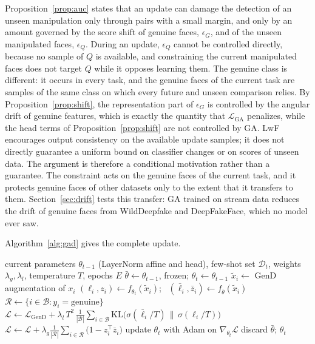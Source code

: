 \documentclass{ieeeaccess}
\begin{document}
Proposition~\ref{prop:auc} states that an update can damage the detection of an unseen manipulation only through pairs with a small margin, and only by an amount governed by the score shift of genuine faces, $\epsilon_G$, and of the unseen manipulated faces, $\epsilon_Q$. During an update, $\epsilon_Q$ cannot be controlled directly, because no sample of $Q$ is available, and constraining the current manipulated faces does not target $Q$ while it opposes learning them. The genuine class is different: it occurs in every task, and the genuine faces of the current task are samples of the same class on which every future and unseen comparison relies. By Proposition~\ref{prop:shift}, the representation part of $\epsilon_G$ is controlled by the angular drift of genuine features, which is exactly the quantity that $\mathcal{L}_{\mathrm{GA}}$ penalizes, while the head terms of Proposition~\ref{prop:shift} are not controlled by GA. LwF encourages output consistency on the available update samples; it does not directly guarantee a uniform bound on classifier changes or on scores of unseen data. The argument is therefore a conditional motivation rather than a guarantee. The constraint acts on the genuine faces of the current task, and it protects genuine faces of other datasets only to the extent that it transfers to them. Section~\ref{sec:drift} tests this transfer: GA trained on stream data reduces the drift of genuine faces from WildDeepfake and DeepFakeFace, which no model ever saw.

Algorithm~\ref{alg:gad} gives the complete update.

\begin{algorithm}[t]
\caption{One GA+LwF update on task $\mathcal{T}_t$}
\label{alg:gad}
\footnotesize
\begin{algorithmic}[1]
\Require current parameters $\theta_{t-1}$ (LayerNorm affine and head), few-shot set $\mathcal{D}_t$, weights $\lambda_g,\lambda_l$, temperature $T$, epochs $E$
\State $\bar\theta\gets\theta_{t-1}$, frozen; $\theta_t\gets\theta_{t-1}$
    \State $\tilde x_i\gets$ GenD augmentation of $x_i$
    \State $(\ell_i,z_i)\gets f_{\theta_t}(\tilde x_i)$; \ $(\bar\ell_i,\bar z_i)\gets f_{\bar\theta}(\tilde x_i)$ 
    \State $\mathcal{R}\gets\{i\in\mathcal{B}:y_i=\text{genuine}\}$
    \State $\mathcal{L}\gets\mathcal{L}_{\mathrm{GenD}}+\lambda_l\,T^2\,\frac{1}{|\mathcal{B}|}\sum_{i\in\mathcal{B}}\mathrm{KL}\big(\sigma(\bar\ell_i/T)\,\|\,\sigma(\ell_i/T)\big)$
      \State $\mathcal{L}\gets\mathcal{L}+\lambda_g\frac{1}{|\mathcal{R}|}\sum_{i\in\mathcal{R}}\big(1-z_i^{\top}\bar z_i\big)$
    \EndIf
    \State update $\theta_t$ with Adam on $\nabla_{\theta_t}\mathcal{L}$
  \EndFor
\EndFor
\State discard $\bar\theta$; \Return $\theta_t$ 
\end{algorithmic}
\end{algorithm}
\end{document}
